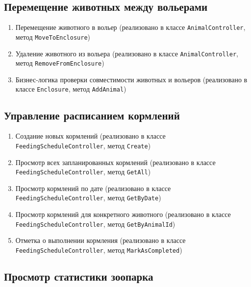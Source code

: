 \documentclass[a4paper,12pt]{article}
\begin{document}
\subsection{Перемещение животных между вольерами}

\begin{enumerate}
    \item Перемещение животного в вольер (реализовано в классе \texttt{AnimalController}, метод \texttt{MoveToEnclosure})
    \item Удаление животного из вольера (реализовано в классе \texttt{AnimalController}, метод \texttt{RemoveFromEnclosure})
    \item Бизнес-логика проверки совместимости животных и вольеров (реализовано в классе \texttt{Enclosure}, метод \texttt{AddAnimal})
\end{enumerate}

\subsection{Управление расписанием кормлений}

\begin{enumerate}
    \item Создание новых кормлений (реализовано в классе \texttt{FeedingScheduleController}, метод \texttt{Create})
    \item Просмотр всех запланированных кормлений (реализовано в классе \texttt{FeedingScheduleController}, метод \texttt{GetAll})
    \item Просмотр кормлений по дате (реализовано в классе \texttt{FeedingScheduleController}, метод \texttt{GetByDate})
    \item Просмотр кормлений для конкретного животного (реализовано в классе \texttt{FeedingScheduleController}, метод \texttt{GetByAnimalId})
    \item Отметка о выполнении кормления (реализовано в классе \texttt{FeedingScheduleController}, метод \texttt{MarkAsCompleted})
\end{enumerate}

\subsection{Просмотр статистики зоопарка}
\end{document}
